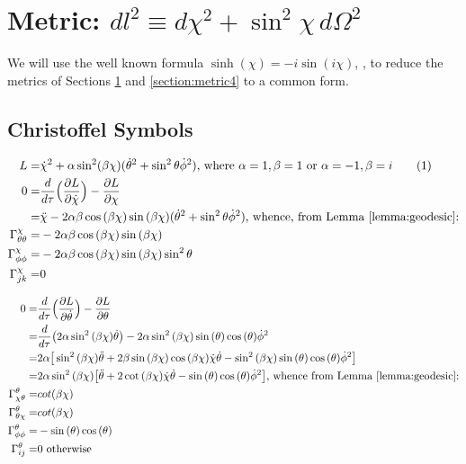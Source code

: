 \documentclass[]{article}
\newcommand\numberthis{\addtocounter{equation}{1}\tag{\theequation}}
\begin{document}
\section{Metric: $dl^2\equiv d\chi^2+\sin^2 \chi\,d\Omega^2$} \label{section:metric2}
We will use the well known formula $\sinh(\chi)=-i \sin(i\chi)$, \cite{wiki:sinh}, to reduce the metrics of Sections \ref{section:metric2} and \ref{section:metric4} to a common form.
\subsection{Christoffel Symbols}

\begin{align*}
L=&\dot{\chi}^2 + \alpha \sin^2(\beta \chi)(\dot\theta^2 + \sin^2 \theta \dot \phi^2)\text{, where $\alpha=1,\beta=1$ or $\alpha=-1,\beta=i$} \numberthis \label{eq:lagrangian2}\\
0=&\frac{d}{d \tau}\Big(\frac{\partial L}{\partial \dot{\chi}}\Big)-\frac{\partial L}{\partial \chi}\\
=&\ddot{\chi}-2\alpha\beta \cos{(\beta\chi)}\sin{(\beta\chi)}(\dot\theta^2 + \sin^2 \theta \dot \phi^2)\text{, whence, from Lemma \ref{lemma:geodesic}:}\\
\Gamma^{\chi}_{\theta\theta}=&-2\alpha\beta \cos{(\beta\chi)}\sin{(\beta\chi)}\\
\Gamma^{\chi}_{\phi\phi}=&-2\alpha\beta \cos{(\beta\chi)}\sin{(\beta\chi)}\sin^2 \theta\\
\Gamma^{\chi}_{jk}=&0
\end{align*}

\begin{align*}
0=&\frac{d}{d \tau}\Big(\frac{\partial L}{\partial \dot{\theta}}\Big)-\frac{\partial L}{\partial \theta}\\
=&\frac{d}{d \tau}\big(2\alpha\sin^2{(\beta\chi)}\dot{\theta}\big)-2\alpha\sin^2{(\beta\chi)}\sin{(\theta)}\cos{(\theta)}\dot{\phi}^2\\
=&2\alpha\big[\sin^2{(\beta\chi)}\ddot{\theta}+2\beta\sin{(\beta\chi)}\cos{(\beta\chi)}\dot{\chi}\dot{\theta}-\sin^2{(\beta\chi)}\sin{(\theta)}\cos{(\theta)}\dot{\phi}^2\big]\\
=&2\alpha\sin^2{(\beta\chi)}\big[\ddot{\theta}+2\cot{(\beta\chi)}\dot{\chi}\dot{\theta}-\sin{(\theta)}\cos{(\theta)}\dot{\phi}^2\big]\text{, whence from Lemma \ref{lemma:geodesic}:}\\
\Gamma^{\theta}_{\chi\theta}=&cot{(\beta\chi)}\\
\Gamma^{\theta}_{\theta\chi}=&cot{(\beta\chi)}\\
\Gamma^{\theta}_{\phi\phi}=&-\sin{(\theta)}\cos{(\theta)}\\
\Gamma^{\theta}_{ij}=&0\text{ otherwise}
\end{align*}
\end{document}

